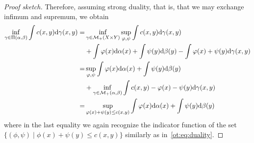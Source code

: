 \begin{proof}[Proof sketch]
    Therefore, assuming strong duality, that is, that we may exchange infimum and supremum, we obtain
    \begin{equation}
        \begin{aligned}
            \inf_{\gamma\in\Pi(\alpha,\beta)}\int c(x,y) \mathrm{d} \gamma(x,y)
            =& \inf_{\gamma\in\mathcal{M}_+(X\times Y)}\sup_{\varphi,\psi} \int c(x,y) \mathrm{d} \gamma(x,y)\\
            &+\int \varphi(x)\mathrm{d}\alpha(x) + \int \psi(y)\mathrm{d} \beta(y) - \int \varphi(x)+\psi(y)\mathrm{d} \gamma(x,y)\\
            =& \sup_{\varphi,\psi}\int \varphi(x)\mathrm{d}\alpha(x) + \int \psi(y)\mathrm{d} \beta(y) \\
            &+ \inf_{\gamma\in\mathcal{M}_+(\alpha,\beta)} \int c(x,y)- \varphi(x)-\psi(y) \mathrm{d} \gamma(x,y)\\
            =& \sup_{\varphi(x)+\psi(y)\leq c(x,y)}\int \varphi(x)\mathrm{d}\alpha(x) + \int \psi(y)\mathrm{d} \beta(y)
        \end{aligned}
    \end{equation}
    where in the last equality we again recognize the indicator function of the set $\{(\phi,\psi)\;|\; \phi(x) + \psi(y)\leq c(x,y)\}$ similarly as in~\eqref{ot:eq:duality}.
\end{proof}

